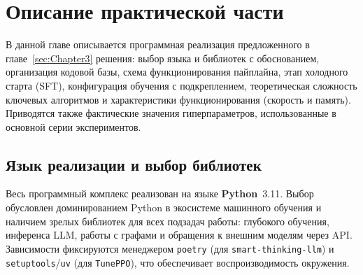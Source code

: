 \section{Описание практической части}
\label{sec:Chapter4} 

В данной главе описывается программная реализация предложенного в главе~\ref{sec:Chapter3} решения: выбор языка и библиотек с обоснованием, организация кодовой базы, схема функционирования пайплайна, этап холодного старта (SFT), конфигурация обучения с подкреплением, теоретическая сложность ключевых алгоритмов и характеристики функционирования (скорость и память). Приводятся также фактические значения гиперпараметров, использованные в основной серии экспериментов.

\subsection{Язык реализации и выбор библиотек}
\label{subsec:impl-language}

Весь программный комплекс реализован на языке \textbf{Python}~3.11. Выбор обусловлен доминированием Python в экосистеме машинного обучения и наличием зрелых библиотек для всех подзадач работы: глубокого обучения, инференса LLM, работы с графами и обращения к внешним моделям через API. Зависимости фиксируются менеджером \texttt{poetry} (для \texttt{smart-thinking-llm}) и \texttt{setuptools}/\texttt{uv} (для \texttt{TunePPO}), что обеспечивает воспроизводимость окружения.

